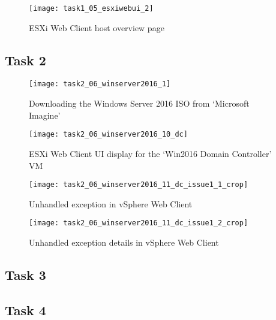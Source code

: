 \begin{figure}[H]
  \centering
  \captionsetup{skip=2pt}
  \texttt{[image: task1\_05\_esxiwebui\_2]}
  \caption{ESXi Web Client host overview page}
  \label{fig:task1:esxiwebui_02}
\end{figure}

\subsection{Task 2}
\begin{figure}[H]
  \centering
  \captionsetup{skip=2pt}
  \texttt{[image: task2\_06\_winserver2016\_1]}
  \caption{Downloading the Windows Server 2016 ISO from `Microsoft Imagine'}
  \label{fig:task2:winserver2016_download}
\end{figure}

\begin{figure}[H]
  \centering
  \captionsetup{skip=2pt}
  \texttt{[image: task2\_06\_winserver2016\_10\_dc]}
  \caption{ESXi Web Client UI display for the `Win2016 Domain Controller' VM}
  \label{fig:task2:vspherewc_newvm4}
\end{figure}

\begin{figure}[H]
  \centering
  \captionsetup{skip=2pt}
  \texttt{[image: task2\_06\_winserver2016\_11\_dc\_issue1\_1\_crop]}
  \caption{Unhandled exception in vSphere Web Client}
  \label{fig:task2:vspherewc_bug1}
\end{figure}

\begin{figure}[H]
  \centering
  \captionsetup{skip=2pt}
  \texttt{[image: task2\_06\_winserver2016\_11\_dc\_issue1\_2\_crop]}
  \caption{Unhandled exception details in vSphere Web Client}
  \label{fig:task2:vspherewc_bug2}
\end{figure}

\subsection{Task 3}

\subsection{Task 4}
